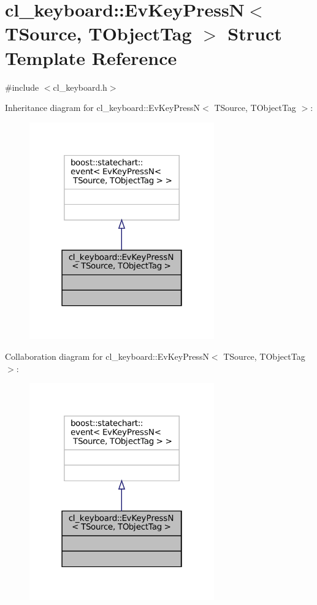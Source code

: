\hypertarget{structcl__keyboard_1_1EvKeyPressN}{}\section{cl\+\_\+keyboard\+:\+:Ev\+Key\+PressN$<$ T\+Source, T\+Object\+Tag $>$ Struct Template Reference}
\label{structcl__keyboard_1_1EvKeyPressN}


{\ttfamily \#include $<$cl\+\_\+keyboard.\+h$>$}



Inheritance diagram for cl\+\_\+keyboard\+:\+:Ev\+Key\+PressN$<$ T\+Source, T\+Object\+Tag $>$\+:
\nopagebreak
\begin{figure}[H]
\begin{center}
\leavevmode
\includegraphics[width=226pt]{structcl__keyboard_1_1EvKeyPressN__inherit__graph}
\end{center}
\end{figure}


Collaboration diagram for cl\+\_\+keyboard\+:\+:Ev\+Key\+PressN$<$ T\+Source, T\+Object\+Tag $>$\+:
\nopagebreak
\begin{figure}[H]
\begin{center}
\leavevmode
\includegraphics[width=226pt]{structcl__keyboard_1_1EvKeyPressN__coll__graph}
\end{center}
\end{figure}


